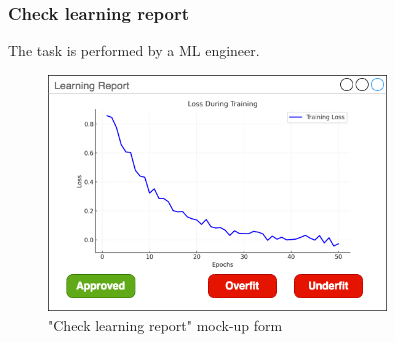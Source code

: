 \subsubsection{Check learning report}

The task is performed by a ML engineer.

\begin{figure}[H]
\centering
\includegraphics[width=0.8\textwidth]{figures/check_learning_report.png}
\caption{"Check learning report" mock-up form}
\end{figure}

